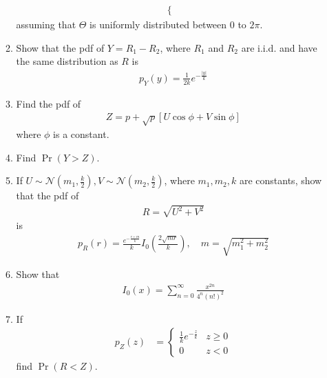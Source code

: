 \documentclass[journal,10pt,twocolumn]{IEEEtran}
\providecommand{\pr}[1]{\ensuremath{\Pr\left(#1\right)}}
\providecommand{\sbrak}[1]{\ensuremath{{}\left[#1\right]}}
\providecommand{\brak}[1]{\ensuremath{\left(#1\right)}}
\providecommand{\abs}[1]{\left\vert#1\right\vert}
\begin{document}
\begin{enumerate}
\begin{enumerate}[label=(\alph{enumii})]
\begin{align}
\begin{cases}
\end{cases}
\end{align}
%
assuming that $\Theta$ is uniformly distributed between 0 to $2\pi$.
\item
Show that the pdf of $Y = R_1-R_2$, where $R_1$ and $R_2$ are i.i.d. and have the same distribution as $R$ is
%
\begin{align}
p_{Y}(y) = \frac{1}{2k}e^{-\frac{\abs{y}}{k}}
\end{align}
%
\item 
 Find the pdf of 
%
\begin{align}
Z = p + \sqrt{p}\sbrak{U \cos \phi + V \sin \phi}
\end{align}
%
where $\phi$ is a constant.
\item 
Find $\pr{Y > Z}$.
\item 
If $U\sim\mathcal{N}\brak{m_1,\frac{k}{2}},V\sim\mathcal{N}\brak{m_2,\frac{k}{2}}$, where $m_1,m_2, k$ are constants, show that the pdf of 
%
\begin{align}
R = \sqrt{U^2+V^2}
\end{align}
%
is
%
\begin{align}
p_{R}\brak{r} = \frac{e^{-\frac{r +m}{k}}}{ k}I_{0}\brak{\frac{2\sqrt{mr}}{k}},\quad m = \sqrt{m_1^2+m_2^2}
\end{align}
%
\item
Show that
\begin{align}
I_0(x) = \sum_{n=0}^{\infty}\frac{x^{2n}}{4^n\brak{n!}^2}
\end{align}
\item 
If
%
\begin{align}
p_{Z}(z) &= 
\begin{cases}
\frac{1}{k} e^{-\frac{z}{k}} & z \geq 0 \\
0 & z < 0
\end{cases}
\end{align}
%
find $\pr{R < Z}$.
\end{enumerate}
\end{enumerate}
\end{document}

